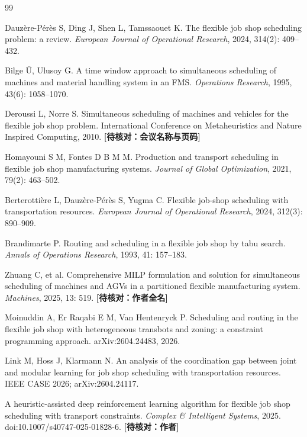 \documentclass[11pt,a4paper]{ctexart}
\theoremstyle{definition}
\theoremstyle{remark}
\begin{document}
\begin{thebibliography}{99}
\small

Dauzère-Pérès S, Ding J, Shen L, Tamssaouet K. The flexible job shop scheduling problem: a review.
\textit{European Journal of Operational Research}, 2024, 314(2): 409--432.

Bilge Ü, Ulusoy G. A time window approach to simultaneous scheduling of machines and material handling system in an FMS.
\textit{Operations Research}, 1995, 43(6): 1058--1070.

Deroussi L, Norre S. Simultaneous scheduling of machines and vehicles for the flexible job shop problem.
International Conference on Metaheuristics and Nature Inspired Computing, 2010. \textbf{[待核对：会议名称与页码]}

Homayouni S M, Fontes D B M M. Production and transport scheduling in flexible job shop manufacturing systems.
\textit{Journal of Global Optimization}, 2021, 79(2): 463--502.

Berterottière L, Dauzère-Pérès S, Yugma C. Flexible job-shop scheduling with transportation resources.
\textit{European Journal of Operational Research}, 2024, 312(3): 890--909.

Brandimarte P. Routing and scheduling in a flexible job shop by tabu search.
\textit{Annals of Operations Research}, 1993, 41: 157--183.

Zhuang C, et al. Comprehensive MILP formulation and solution for simultaneous scheduling of machines and AGVs in a partitioned flexible manufacturing system.
\textit{Machines}, 2025, 13: 519. \textbf{[待核对：作者全名]}

Moinuddin A, Er Raqabi E M, Van Hentenryck P. Scheduling and routing in the flexible job shop with heterogeneous transbots and zoning: a constraint programming approach.
arXiv:2604.24483, 2026.

Link M, Hoss J, Klarmann N. An analysis of the coordination gap between joint and modular learning for job shop scheduling with transportation resources.
IEEE CASE 2026; arXiv:2604.24117.

A heuristic-assisted deep reinforcement learning algorithm for flexible job shop scheduling with transport constraints.
\textit{Complex \& Intelligent Systems}, 2025. doi:10.1007/s40747-025-01828-6. \textbf{[待核对：作者]}


\end{thebibliography}
\end{document}
